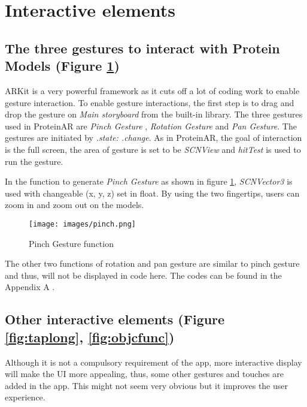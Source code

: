 \section{Interactive elements}
\subsection{The three gestures to interact with Protein Models (Figure \ref{fig:pinch})}
ARKit is a very powerful framework as it cuts off a lot of coding work to enable gesture interaction. To enable gesture interactions, the first step is to drag and drop the gesture on \emph{Main storyboard} from the built-in library. The three gestures used in ProteinAR are \emph{Pinch Gesture} , \emph{Rotation Gesture} and \emph{Pan Gesture}. The gestures are initiated by \emph{.state: .change}. As in ProteinAR, the goal of interaction is the full screen, the area of gesture is set to be \emph{SCNView} and \emph{hitTest} is used to run the gesture. 

In the function to generate \emph{Pinch Gesture} as shown in figure \ref{fig:pinch}, \emph{SCNVector3} is used with changeable (x, y, z) set in float. By using the two fingertips, users can zoom in and zoom out on the models. 
\begin{figure}[!htp]
	\centering
	\texttt{[image: images/pinch.png]}
	\caption{Pinch Gesture function}
	\label{fig:pinch}
\end{figure}
The other two functions of rotation and pan gesture are similar to pinch gesture and thus, will not be displayed in code here. The codes can be found in the Appendix A . 

\subsection{Other interactive elements (Figure \ref{fig:taplong}, \ref{fig:objcfunc})}
Although it is not a compulsory requirement of the app, more interactive display will make the UI more appealing, thus, some other gestures and touches are added in the app. This might not seem very obvious but it improves the user experience.

